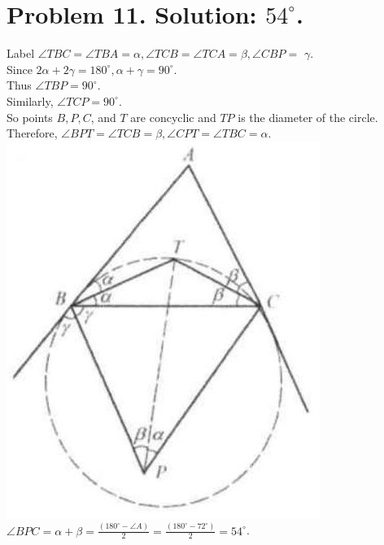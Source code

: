 \documentclass[10pt]{article}
\begin{document}
\section*{Problem 11. Solution: \(54^{\circ}\).}
Label \(\angle T B C=\angle T B A=\alpha, \angle T C B=\angle T C A=\beta, \angle C B P=\) \(\gamma\).\\
Since \(2 \alpha+2 \gamma=180^{\circ}, \alpha+\gamma=90^{\circ}\).\\
Thus \(\angle T B P=90^{\circ}\).\\
Similarly, \(\angle T C P=90^{\circ}\).\\
So points \(B, P, C\), and \(T\) are concyclic and \(T P\) is the diameter of the circle.\\
Therefore, \(\angle B P T=\angle T C B=\beta, \angle C P T=\angle T B C=\alpha\).\\
\includegraphics[max width=\textwidth, center]{2025_04_17_97bc1f7e44d93c271a88g-213(1)}\\
\(\angle B P C=\alpha+\beta=\frac{\left(180^{\circ}-\angle A\right)}{2}=\frac{\left(180^{\circ}-72^{\circ}\right)}{2}=54^{\circ}\).
\end{document}
